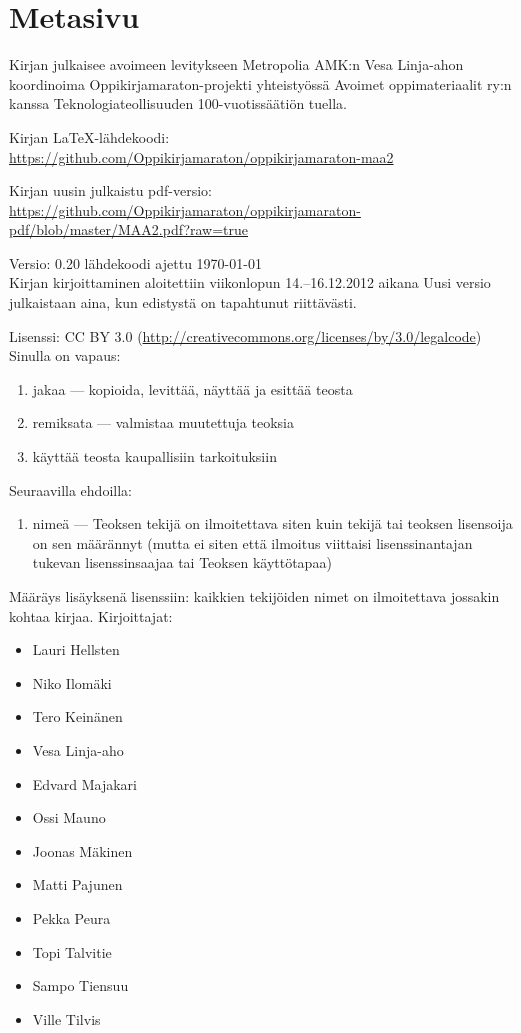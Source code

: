 \newpage
\section*{Metasivu}


Kirjan julkaisee avoimeen levitykseen Metropolia AMK:n Vesa Linja-ahon koordinoima Oppikirjamaraton-projekti yhteistyössä Avoimet oppimateriaalit ry:n kanssa Teknologiateollisuuden 100-vuotissäätiön tuella.

Kirjan LaTeX-lähdekoodi: \\
\url{https://github.com/Oppikirjamaraton/oppikirjamaraton-maa2}

Kirjan uusin julkaistu pdf-versio: \\
\url{https://github.com/Oppikirjamaraton/oppikirjamaraton-pdf/blob/master/MAA2.pdf?raw=true}

Versio: 0.20 \qquad lähdekoodi ajettu \today \\
Kirjan kirjoittaminen aloitettiin viikonlopun 14.--16.12.2012 aikana
Uusi versio julkaistaan aina, kun edistystä on tapahtunut riittävästi.

Lisenssi: CC BY 3.0 (\url{http://creativecommons.org/licenses/by/3.0/legalcode})\\
Sinulla on vapaus:
\begin{enumerate}
\item jakaa — kopioida, levittää, näyttää ja esittää teosta
\item remiksata — valmistaa muutettuja teoksia
\item käyttää teosta kaupallisiin tarkoituksiin
\end{enumerate}
Seuraavilla ehdoilla:
\begin{enumerate}
\item nimeä — Teoksen tekijä on ilmoitettava siten kuin tekijä tai teoksen lisensoija on sen määrännyt (mutta ei siten että ilmoitus viittaisi lisenssinantajan tukevan lisenssinsaajaa tai Teoksen käyttötapaa)
\end{enumerate}

Määräys lisäyksenä lisenssiin: kaikkien tekijöiden nimet on ilmoitettava jossakin kohtaa kirjaa.
Kirjoittajat:
\begin{itemize}
\item Lauri Hellsten
\item Niko Ilomäki
\item Tero Keinänen
\item Vesa Linja-aho
\item Edvard Majakari
\item Ossi Mauno
\item Joonas Mäkinen
\item Matti Pajunen
\item Pekka Peura
\item Topi Talvitie
\item Sampo Tiensuu
\item Ville Tilvis
\end{itemize}

